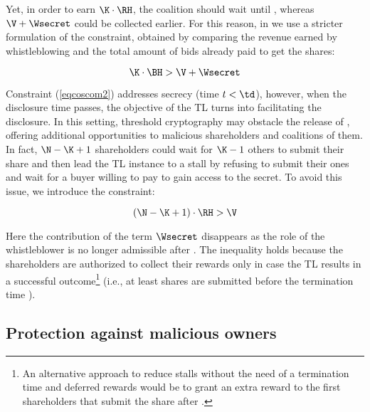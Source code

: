Yet, in order to earn $\K \cdot \RH$, the coalition \coalition should wait until \td, whereas $\V + \Wsecret$ could be collected earlier.
For this reason, in \shortname we use a stricter formulation of the constraint, obtained by comparing the revenue earned by whistleblowing and the total amount of bids already paid \coalition to get the shares:

\begin{equation}\label{eqcoscom2}
\K \cdot \BH > \V + \Wsecret
\end{equation}

Constraint (\ref{eqcoscom2}) addresses secrecy (time $t < \td$), however, when the disclosure time passes, the objective of the TL turns into facilitating the disclosure.
In this setting, threshold cryptography may obstacle the release of \secret, offering additional opportunities to malicious shareholders and coalitions of them.
In fact, $\N - \K + 1$ shareholders could wait for $\K - 1$ others to submit their share and then lead the TL instance to a stall by refusing to submit their ones and wait for a buyer willing to pay \V to gain access to the secret.
To avoid this issue, we introduce the constraint:  

\begin{equation}\label{eqcoscom4}
(\N - \K + 1) \cdot \RH  > \V
\end{equation}

Here the contribution of the term $\Wsecret$ disappears as the role of the whistleblower is no longer admissible after \td. The inequality holds because the shareholders are authorized to collect their rewards \RH only in case the TL results in a successful outcome\footnote{An alternative approach to reduce stalls without the need of a termination time and deferred rewards would be to grant an extra reward \extrareward to the first \K shareholders that submit the share after \td.
}
(i.e., at least \K shares are submitted before the termination time \te).


\subsection{Protection against malicious owners}\label{sect:mal_own}

